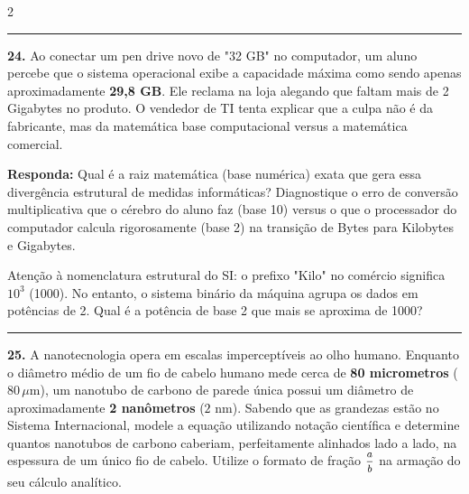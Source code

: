 \documentclass[twoside, 10pt, a4paper]{article}
\begin{document}
\begin{multicols*}{2}
\noindent\textcolor{CorLinha}{\rule{\linewidth}{0.5pt}} 
\par\par\vspace{0.5cm}
\textbf{24.} Ao conectar um pen drive novo de "32 GB" no computador, um aluno percebe que o sistema operacional exibe a capacidade máxima como sendo apenas aproximadamente \textbf{29,8 GB}. Ele reclama na loja alegando que faltam mais de 2 Gigabytes no produto. O vendedor de TI tenta explicar que a culpa não é da fabricante, mas da matemática base computacional versus a matemática comercial.
\begin{boxresponda}
\textbf{Responda:} Qual é a raiz matemática (base numérica) exata que gera essa divergência estrutural de medidas informáticas? Diagnostique o erro de conversão multiplicativa que o cérebro do aluno faz (base 10) versus o que o processador do computador calcula rigorosamente (base 2) na transição de Bytes para Kilobytes e Gigabytes.
\end{boxresponda}
\begin{boxdica}
    Atenção à nomenclatura estrutural do SI: o prefixo "Kilo" no comércio significa $10^3$ (1000). No entanto, o sistema binário da máquina agrupa os dados em potências de 2. Qual é a potência de base 2 que mais se aproxima de 1000?
\end{boxdica}
\par\vspace{0.5cm}
\noindent\textcolor{CorLinha}{\rule{\linewidth}{0.5pt}} 
\par\par\vspace{0.5cm}
\textbf{25.} A nanotecnologia opera em escalas imperceptíveis ao olho humano. Enquanto o diâmetro médio de um fio de cabelo humano mede cerca de \textbf{80 micrometros} ($80 \, \mu\text{m}$), um nanotubo de carbono de parede única possui um diâmetro de aproximadamente \textbf{2 nanômetros} ($2 \text{ nm}$). Sabendo que as grandezas estão no Sistema Internacional, modele a equação utilizando notação científica e determine quantos nanotubos de carbono caberiam, perfeitamente alinhados lado a lado, na espessura de um único fio de cabelo. Utilize o formato de fração $ \mfrac{a}{b} $ na armação do seu cálculo analítico.
\par\vspace{0.5cm}


\end{multicols*}
\end{document}
